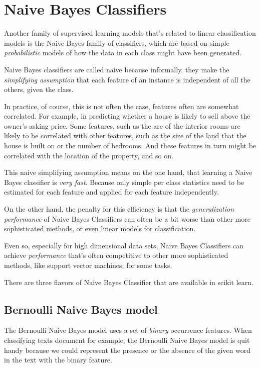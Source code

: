 \section{Naive Bayes Classifiers}

Another family of supervised learning models that's related to linear classification models is the Naive Bayes family of classifiers, which are based on simple \emph{probabilistic} models of how the data in each class might have been generated. 

Naive Bayes classifiers are called naive because informally, they make the \emph{simplifying assumption} that each feature of an instance is independent of all the others, given the class. 

In practice, of course, this is not often the case, features often are somewhat correlated. For example, in predicting whether a house is likely to sell above the owner's asking price. Some features, such as the are of the interior rooms are likely to be correlated with other features, such as the size of the land that the house is built on or the number of bedrooms. And these features in turn might be correlated with the location of the property, and so on. 

This naive simplifying assumption means on the one hand, that learning a Naive Bayes classifier is \emph{very fast}. Because only simple per class statistics need to be estimated for each feature and applied for each feature independently. 

On the other hand, the penalty for this efficiency is that the \emph{generalization performance} of Naive Bayes Classifiers can often be a bit worse than other more sophisticated methods, or even linear models for classification. 

Even so, especially for high dimensional data sets, Naive Bayes Classifiers can achieve \emph{performance} that's often competitive to other more sophisticated methods, like support vector machines, for some tasks. 

There are three flavors of Naive Bayes Classifier that are available in scikit learn.

\subsection{Bernoulli Naive Bayes model}

The Bernoulli Naive Bayes model uses a set of \emph{binary} occurrence features. When classifying texts document for example, the Bernoulli Naive Bayes model is quit handy because we could represent the presence or the absence of the given word in the text with the binary feature. 

